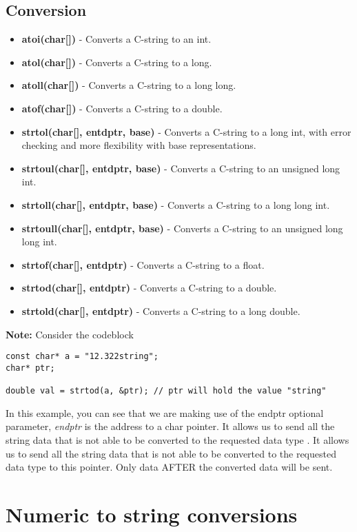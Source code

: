 \documentclass{report}
\begin{document}
    \subsection{Conversion}
    \begin{itemize}
        \item \textbf{atoi(char[])} - Converts a C-string to an int.
        \item \textbf{atol(char[])} - Converts a C-string to a long.
        \item \textbf{atoll(char[])} - Converts a C-string to a long long.
        \item \textbf{atof(char[])} - Converts a C-string to a double.
        \item \textbf{strtol(char[], entdptr, base)} - Converts a C-string to a long int, with error checking and more flexibility with base representations.
        \item \textbf{strtoul(char[], entdptr, base)} - Converts a C-string to an unsigned long int.
        \item \textbf{strtoll(char[], entdptr, base)} - Converts a C-string to a long long int.
        \item \textbf{strtoull(char[], entdptr, base)} - Converts a C-string to an unsigned long long int.
        \item \textbf{strtof(char[], entdptr)} - Converts a C-string to a float.
        \item \textbf{strtod(char[], entdptr)} - Converts a C-string to a double.
        \item \textbf{strtold(char[], entdptr)} - Converts a C-string to a long double.
    \end{itemize}
    \bigbreak \noindent 
    \textbf{Note:} Consider the codeblock
    \begin{verbatim}
const char* a = "12.322string";
char* ptr;

double val = strtod(a, &ptr); // ptr will hold the value "string"
    \end{verbatim}
    \bigbreak \noindent 
    In this example, you can see that we are making use of the endptr optional parameter, \textit{endptr} is the address to a char pointer. It allows us to send all the string data that is not able to be converted to the requested data type . It allows us to send all the string data that is not able to be converted to the requested data type to this pointer. Only data AFTER the converted data will be sent.

    
    \pagebreak \bigbreak \noindent 
    \section{\LARGE Numeric to string conversions}
    \bigbreak \noindent 
\end{document}
